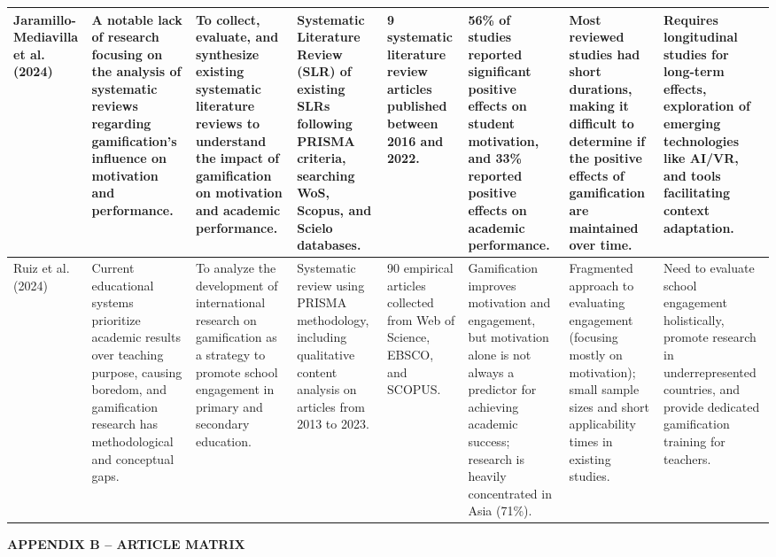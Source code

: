 \documentclass[12pt,a4paper]{article}
\begin{document}
\begin{table}[H]
{\begin{tabular}{|p{2.5cm}|p{2.5cm}|p{2cm}|p{2.5cm}|p{2.5cm}|p{2.5cm}|p{2.5cm}|p{2.5cm}|}
\tabularnewline
\hline
Jaramillo-Mediavilla et al. (2024) & A notable lack of research focusing on the analysis of systematic reviews regarding gamification's influence on motivation and performance. & To collect, evaluate, and synthesize existing systematic literature reviews to understand the impact of gamification on motivation and academic performance. & Systematic Literature Review (SLR) of existing SLRs following PRISMA criteria, searching WoS, Scopus, and Scielo databases. & 9 systematic literature review articles published between 2016 and 2022. & 56\% of studies reported significant positive effects on student motivation, and 33\% reported positive effects on academic performance. & Most reviewed studies had short durations, making it difficult to determine if the positive effects of gamification are maintained over time. & Requires longitudinal studies for long-term effects, exploration of emerging technologies like AI/VR, and tools facilitating context adaptation.
\tabularnewline
\hline
Ruiz et al. (2024) & Current educational systems prioritize academic results over teaching purpose, causing boredom, and gamification research has methodological and conceptual gaps. & To analyze the development of international research on gamification as a strategy to promote school engagement in primary and secondary education. & Systematic review using PRISMA methodology, including qualitative content analysis on articles from 2013 to 2023. & 90 empirical articles collected from Web of Science, EBSCO, and SCOPUS. & Gamification improves motivation and engagement, but motivation alone is not always a predictor for achieving academic success; research is heavily concentrated in Asia (71\%). & Fragmented approach to evaluating engagement (focusing mostly on motivation); small sample sizes and short applicability times in existing studies. & Need to evaluate school engagement holistically, promote research in underrepresented countries, and provide dedicated gamification training for teachers.
\tabularnewline
\hline
\end{tabular}%
}
\end{table}




\newpage

{}

\begin{flushleft}
    {\fontsize{14pt}{17pt}\selectfont
    \textbf{APPENDIX B -- ARTICLE MATRIX}}
\end{flushleft}
\end{document}
